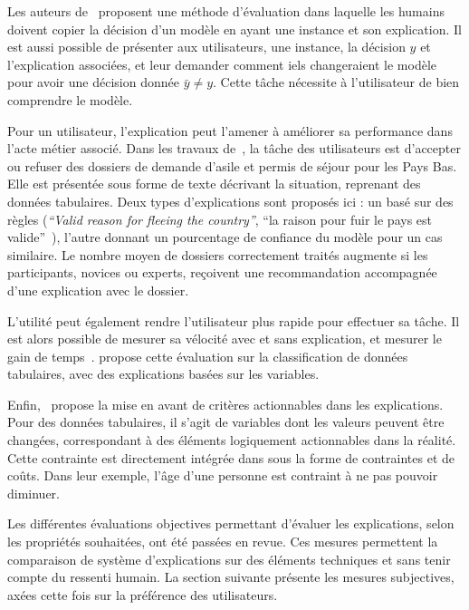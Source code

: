 Les auteurs de~\cite{Dam2018} proposent une méthode d'évaluation dans laquelle les humains doivent copier la décision d'un modèle en ayant une instance et son explication. Il est aussi possible de présenter aux utilisateurs, une instance, la décision $y$ et l'explication associées, et leur demander comment iels changeraient le modèle pour avoir une décision donnée $\bar{y} \neq y$. Cette tâche nécessite à l'utilisateur de bien comprendre le modèle.

Pour un utilisateur, l'explication peut l'amener à améliorer sa performance dans l'acte métier associé. Dans les travaux de~\cite{Janssen2020}, la tâche des utilisateurs est d'accepter ou refuser des dossiers de demande d'asile et permis de séjour pour les Pays Bas. Elle est présentée sous forme de texte décrivant la situation, reprenant des données tabulaires.
Deux types d'explications sont proposés ici : un basé sur des règles (\textit{``Valid reason for fleeing the country''}, ``la raison pour fuir le pays est valide''~\cite{Janssen2020}), l'autre donnant un pourcentage de confiance du modèle pour un cas similaire.
Le nombre moyen de dossiers correctement traités augmente si les participants, novices ou experts, reçoivent une recommandation accompagnée d'une explication avec le dossier.

L'utilité peut également rendre l'utilisateur plus rapide pour effectuer sa tâche. Il est alors possible de mesurer sa vélocité avec et sans explication, et mesurer le gain de temps~\cite{Ribeiro2018,Zafar2021a}. \cite{Ribeiro2018} propose cette évaluation sur la classification de données tabulaires, avec des explications basées sur les variables.  %

Enfin,~\cite{Rasouli2022} propose la mise en avant de critères actionnables dans les explications. Pour des données tabulaires, il s'agit de variables dont les valeurs peuvent être changées, correspondant à des éléments logiquement actionnables dans la réalité. Cette contrainte est directement intégrée dans sous la forme de contraintes et de coûts. Dans leur exemple, l'âge d'une personne est contraint à ne pas pouvoir diminuer.

Les différentes évaluations objectives permettant d'évaluer les explications, selon les propriétés souhaitées, ont été passées en revue. Ces mesures permettent la comparaison de système d'explications sur des éléments techniques et sans tenir compte du ressenti humain. La section suivante présente les mesures subjectives, axées cette fois sur la préférence des utilisateurs.

